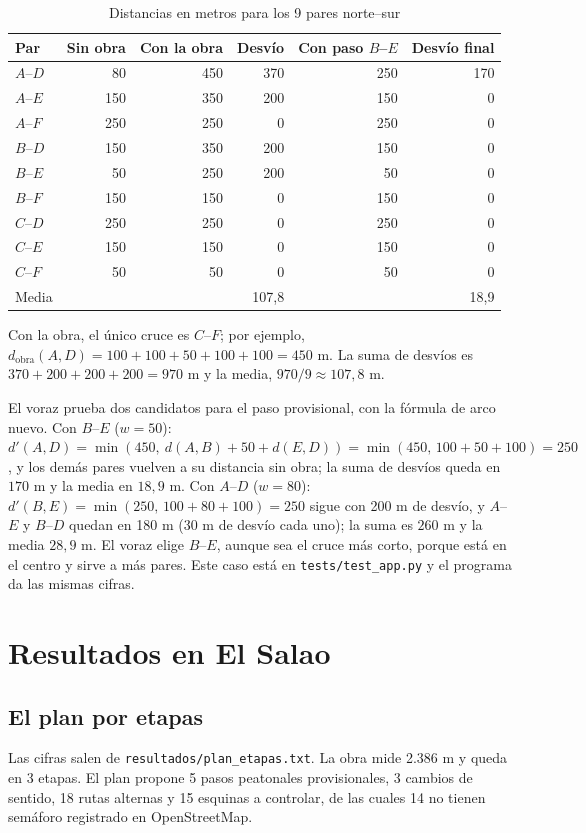 \documentclass[12pt,letterpaper]{article}
\begin{document}
\begin{table}[H]
\centering
\caption{Distancias en metros para los 9 pares norte--sur}
\label{tab:mano}
\begin{tabular}{@{}lrrrrr@{}}
\toprule
Par & Sin obra & Con la obra & Desvío & Con paso $B$--$E$ & Desvío final\\
\midrule
$A$--$D$ & 80 & 450 & 370 & 250 & 170\\
$A$--$E$ & 150 & 350 & 200 & 150 & 0\\
$A$--$F$ & 250 & 250 & 0 & 250 & 0\\
$B$--$D$ & 150 & 350 & 200 & 150 & 0\\
$B$--$E$ & 50 & 250 & 200 & 50 & 0\\
$B$--$F$ & 150 & 150 & 0 & 150 & 0\\
$C$--$D$ & 250 & 250 & 0 & 250 & 0\\
$C$--$E$ & 150 & 150 & 0 & 150 & 0\\
$C$--$F$ & 50 & 50 & 0 & 50 & 0\\
\midrule
Media & & & 107,8 & & 18,9\\
\bottomrule
\end{tabular}
\end{table}

Con la obra, el único cruce es $C$--$F$; por ejemplo, $d_{\text{obra}}(A,D)=100+100+50+100+100=450$ m. La suma de desvíos es $370+200+200+200=970$ m y la media, $970/9\approx 107{,}8$ m.

El voraz prueba dos candidatos para el paso provisional, con la fórmula de arco nuevo. Con $B$--$E$ ($w=50$): $d'(A,D)=\min(450,\ d(A,B)+50+d(E,D))=\min(450,\,100+50+100)=250$, y los demás pares vuelven a su distancia sin obra; la suma de desvíos queda en $170$ m y la media en $18{,}9$ m. Con $A$--$D$ ($w=80$): $d'(B,E)=\min(250,\,100+80+100)=250$ sigue con 200 m de desvío, y $A$--$E$ y $B$--$D$ quedan en 180 m (30 m de desvío cada uno); la suma es $260$ m y la media $28{,}9$ m. El voraz elige $B$--$E$, aunque sea el cruce más corto, porque está en el centro y sirve a más pares. Este caso está en \texttt{tests/test\_app.py} y el programa da las mismas cifras.

\section{Resultados en El Salao}
\subsection{El plan por etapas}
Las cifras salen de \texttt{resultados/plan\_etapas.txt}. La obra mide 2.386 m y queda en 3 etapas. El plan propone 5 pasos peatonales provisionales, 3 cambios de sentido, 18 rutas alternas y 15 esquinas a controlar, de las cuales 14 no tienen semáforo registrado en OpenStreetMap.
\end{document}
